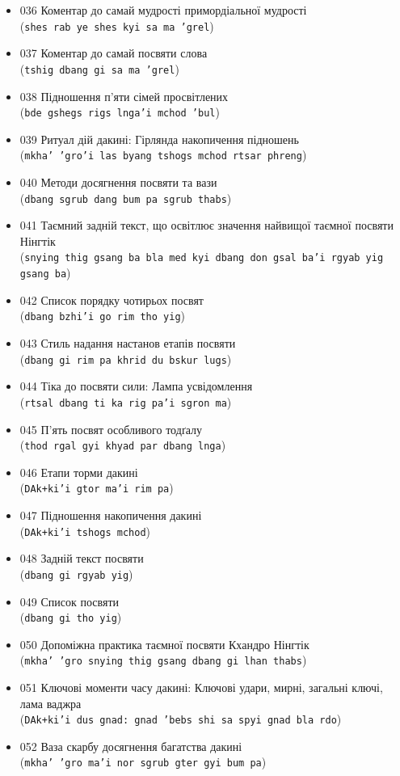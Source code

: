\documentclass{article}
\begin{document}
\begin{itemize}
\item 036 Коментар до самай мудрості примордіальної мудрості \\ (\texttt{shes rab ye shes kyi sa ma 'grel})
\item 037 Коментар до самай посвяти слова \\ (\texttt{tshig dbang gi sa ma 'grel})
\item 038 Підношення п'яти сімей просвітлених \\ (\texttt{bde gshegs rigs lnga'i mchod 'bul})
\item 039 Ритуал дій дакині: Гірлянда накопичення підношень \\ (\texttt{mkha' 'gro'i las byang tshogs mchod rtsar phreng})
\item 040 Методи досягнення посвяти та вази \\ (\texttt{dbang sgrub dang bum pa sgrub thabs})
\item 041 Таємний задній текст, що освітлює значення найвищої таємної посвяти Нінгтік \\ (\texttt{snying thig gsang ba bla med kyi dbang don gsal ba'i rgyab yig gsang ba})
\item 042 Список порядку чотирьох посвят \\ (\texttt{dbang bzhi'i go rim tho yig})
\item 043 Стиль надання настанов етапів посвяти \\ (\texttt{dbang gi rim pa khrid du bskur lugs})
\item 044 Тіка до посвяти сили: Лампа усвідомлення \\ (\texttt{rtsal dbang ti ka rig pa'i sgron ma})
\item 045 П'ять посвят особливого тодґалу \\ (\texttt{thod rgal gyi khyad par dbang lnga})
\item 046 Етапи торми дакині \\ (\texttt{DAk+ki'i gtor ma'i rim pa})
\item 047 Підношення накопичення дакині \\ (\texttt{DAk+ki'i tshogs mchod})
\item 048 Задній текст посвяти \\ (\texttt{dbang gi rgyab yig})
\item 049 Список посвяти \\ (\texttt{dbang gi tho yig})
\item 050 Допоміжна практика таємної посвяти Кхандро Нінгтік \\ (\texttt{mkha' 'gro snying thig gsang dbang gi lhan thabs})
\item 051 Ключові моменти часу дакині: Ключові удари, мирні, загальні ключі, лама ваджра \\ (\texttt{DAk+ki'i dus gnad: gnad 'bebs shi sa spyi gnad bla rdo})
\item 052 Ваза скарбу досягнення багатства дакині \\ (\texttt{mkha' 'gro ma'i nor sgrub gter gyi bum pa})
\end{itemize}
\endgroup
\end{document}
